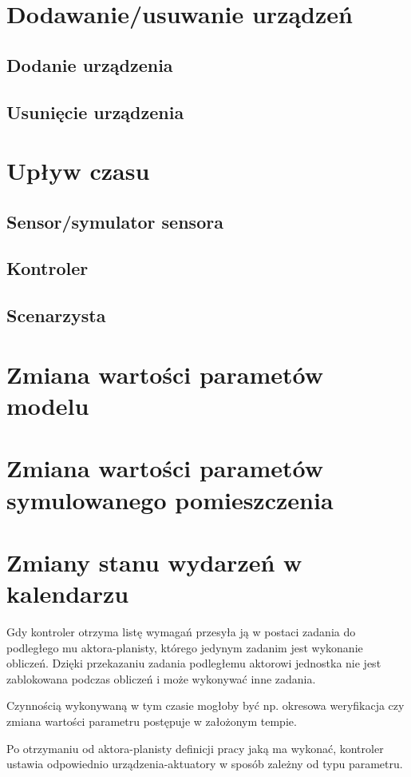 \section{Dodawanie/usuwanie urządzeń}
\subsection*{Dodanie urządzenia}

\subsection*{Usunięcie urządzenia}


\section{Upływ czasu}
\subsection{Sensor/symulator sensora}

\subsection{Kontroler}

\subsection{Scenarzysta}


\section{Zmiana wartości parametów modelu}

\section{Zmiana wartości parametów symulowanego pomieszczenia}

\section{Zmiany stanu wydarzeń w kalendarzu}

Gdy kontroler otrzyma listę wymagań przesyła ją w postaci zadania do podległego mu aktora-planisty, którego jedynym zadanim jest wykonanie obliczeń. Dzięki przekazaniu zadania podległemu aktorowi jednostka nie jest zablokowana podczas obliczeń i może wykonywać inne zadania. 

Czynnością wykonywaną w tym czasie mogłoby być np. okresowa weryfikacja czy zmiana wartości parametru postępuje w założonym tempie.

Po otrzymaniu od aktora-planisty definicji pracy jaką ma wykonać, kontroler ustawia odpowiednio urządzenia-aktuatory w sposób zależny od typu parametru.


